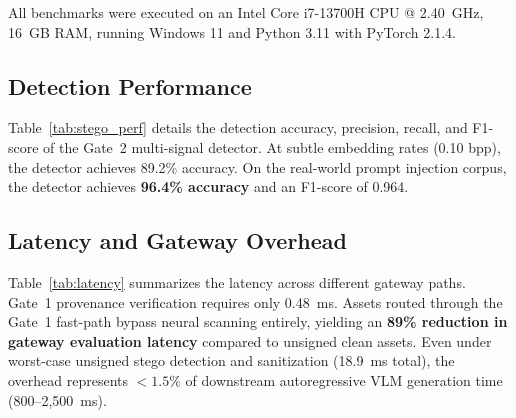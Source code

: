 \documentclass[conference]{IEEEtran}
\begin{document}
All benchmarks were executed on an Intel Core i7-13700H CPU @ 2.40~GHz, 16~GB RAM, running Windows 11 and Python 3.11 with PyTorch 2.1.4.

\subsection{Detection Performance}
Table~\ref{tab:stego_perf} details the detection accuracy, precision, recall, and F1-score of the Gate~2 multi-signal detector. At subtle embedding rates (0.10 bpp), the detector achieves 89.2\% accuracy. On the real-world prompt injection corpus, the detector achieves \textbf{96.4\% accuracy} and an F1-score of 0.964.

\begin{table}[t]
\caption{Gate 2 Multi-Signal Steganalysis Performance}
\label{tab:stego_perf}
\centering
\vspace{-1.5mm}
\vspace{1.5mm}
\end{table}

\subsection{Latency and Gateway Overhead}
Table~\ref{tab:latency} summarizes the latency across different gateway paths. Gate~1 provenance verification requires only 0.48~ms. Assets routed through the Gate~1 fast-path bypass neural scanning entirely, yielding an \textbf{89\% reduction in gateway evaluation latency} compared to unsigned clean assets. Even under worst-case unsigned stego detection and sanitization (18.9~ms total), the overhead represents $<1.5\%$ of downstream autoregressive VLM generation time (800--2,500~ms).
\end{document}

